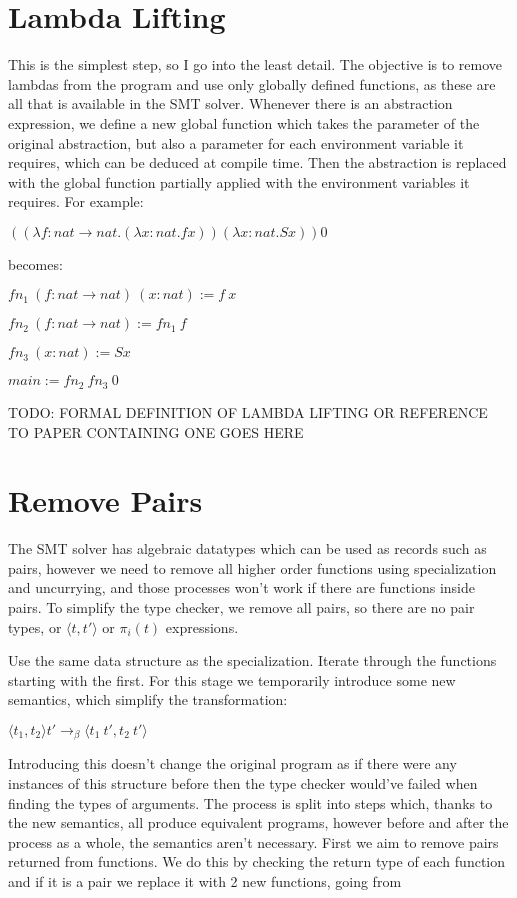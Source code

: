\documentclass[12pt,a4paper,titlepage]{article}
\begin{document}
    \section{Lambda Lifting}
    This is the simplest step, so I go into the least detail.
    The objective is to remove lambdas from the program and use only globally defined functions, as these are all
    that is available in the SMT solver.
    Whenever there is an abstraction expression, we define a new global function which takes the parameter of the
    original abstraction, but also a parameter for each environment variable it requires, which can be deduced at
    compile time.
    Then the abstraction is replaced with the global function partially applied with the environment variables it
    requires. For example:

    $((\lambda f: nat \rightarrow nat . (\lambda x: nat . f x)) (\lambda x: nat . S x)) 0$

    becomes:

    $fn_1\ (f: nat \rightarrow nat)\ (x: nat) := f\ x$

    $fn_2\ (f: nat \rightarrow nat) := fn_1\ f$

    $fn_3\ (x: nat) := S x$

    $main := fn_2\ fn_3\ 0$

    TODO: FORMAL DEFINITION OF LAMBDA LIFTING OR REFERENCE TO PAPER CONTAINING ONE GOES HERE

    \section{Remove Pairs}

    The SMT solver has algebraic datatypes which can be used as records such as pairs, however we need to remove
    all higher order functions using specialization and uncurrying, and those processes won't work if there
    are functions inside pairs.
    To simplify the type checker, we remove all pairs, so there are no pair types, or $\langle t, t' \rangle$ or
    $\pi_i (t)$ expressions.

    Use the same data structure as the specialization. Iterate through the functions starting with the first.
    For this stage we temporarily introduce some new semantics, which simplify the transformation:

    $\langle t_1, t_2 \rangle t' \rightarrow_\beta \langle t_1\ t', t_2\ t' \rangle$

    Introducing this doesn't change the original program as if there were any instances of this structure before
    then the type checker would've failed when finding the types of arguments.
    The process is split into steps which, thanks to the new semantics, all produce equivalent programs,
    however before and after the process as a whole, the semantics aren't necessary.
    First we aim to remove pairs returned from functions. We do this by checking the return type of each function
    and if it is a pair we replace it with 2 new functions, going from
\end{document}
